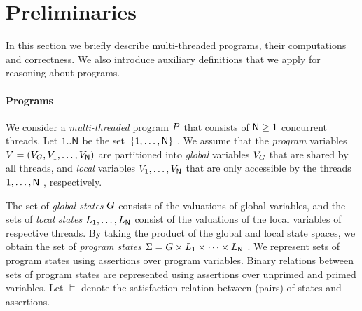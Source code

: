 \section{Preliminaries}\label{sec-prelim}

In this section we briefly describe multi-threaded programs, their
computations and correctness. 
We also introduce auxiliary definitions that we apply for reasoning
about programs.

\paragraph{Programs}


We consider a \emph{multi-threaded} program $P$ that consists
of $\mathsf{N}\geq 1$ concurrent threads.
Let $1..\mathsf{N}$ be the set~$\{1, \dots, \mathsf{N}\}\ $.
We assume that the \emph{program} variables $V = (V_G,
V_{1}, \dots, V_{\mathsf{N}})$ are partitioned into
\emph{global} variables $V_G$ that are shared by all threads,
and \emph{local} variables $V_{1}, \dots, V_{\mathsf{N}}$
that are only accessible by the threads $1, \dots, \mathsf{N}\ $,
respectively.

The set of \emph{global states} $G$ consists of the valuations of
global variables, and the sets of \emph{local states} $L_1, \dots,
L_{\mathsf{N}}$ consist of the valuations of the local variables of
respective threads.
By taking the product of the global and local state spaces, we obtain
the set of \emph{program states} $\Sigma = G \times L_1 \times
\dots \times L_{\mathsf{N}}\ $.
We represent sets of program states using assertions over program
variables. 
Binary relations between sets of program states are represented using
assertions over unprimed and primed variables.
Let $\models$ denote the satisfaction relation between (pairs) of
states and assertions.

